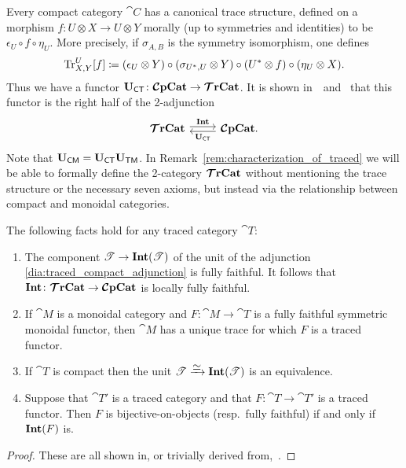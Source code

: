 \documentclass[11pt,oneside,article]{memoir}
\begin{document}
Every compact category $\cat{C}$ has a canonical trace structure, defined on a morphism $f\colon
U\otimes X\to U\otimes Y$ morally (up to symmetries and identities) to be $\epsilon_U\circ f\circ
\eta_U$. More precisely, if $\sigma_{A,B}$ is the symmetry isomorphism, one defines
\begin{equation*}
   \operatorname{Tr}^U_{X,Y}[f]\coloneqq(\epsilon_U\otimes Y)\circ (\sigma_{U^*,U}\otimes Y)\circ (U^*\otimes f)\circ (\eta_U\otimes X).
\end{equation*}
Thus we have a functor $\mathbf{U}_{\mathsf{CT}}\colon\bm{\mathcal{C}}\mathbf{pCat}\to\bm{\mathcal{T}}\mathbf{rCat}$. It is shown in~\cite{JoyalStreetVerity}~and~\cite{HK} that this functor is the right half of the 2-adjunction
\begin{equation}
      \label{dia:traced_compact_adjunction}
   \begin{tikzcd}
      \TTrCat\arrow[r,shift left=.5ex, "\Int"]&\CCompCat\arrow[l,shift left=.5ex,"\UCT"].
   \end{tikzcd}
\end{equation}
Note that $\mathbf{U}_{\mathsf{CM}}=\mathbf{U}_{\mathsf{CT}}\mathbf{U}_{\mathsf{TM}}$.  In Remark~\ref{rem:characterization_of_traced} we will be able to formally define the 2-category
$\bm{\mathcal{T}}\mathbf{rCat}$ without mentioning the trace structure or the necessary seven axioms, but instead via the
relationship between compact and monoidal categories.


\begin{lemma}
      \label{lemma:fully_faithful_and_trace}
   The following facts hold for any traced category $\cat{T}$:
   \begin{enumerate}[label={\upshape\roman*}.]
      \item The component $\mathscr{T}\to\mathbf{Int}(\mathscr{T})$ of the unit of the adjunction
         \eqref{dia:traced_compact_adjunction} is fully faithful. It follows that
         $\mathbf{Int}\colon\bm{\mathcal{T}}\mathbf{rCat}\to\bm{\mathcal{C}}\mathbf{pCat}$ is locally fully faithful.
      \item If $\cat{M}$ is a monoidal category and $F\colon\cat{M}\to\cat{T}$ is a fully faithful
         symmetric monoidal functor, then $\cat{M}$ has a unique trace for which $F$ is a traced
         functor.
      \item If $\cat{T}$ is compact then the unit
         $\cat{T}\To{\raisebox{-1ex}{$\equiv$}}\Int(\cat{T})$ is an equivalence.
      \item Suppose that $\cat{T'}$ is a traced category and that $F\colon \cat{T}\to \cat{T}'$ is a
         traced functor. Then $F$ is bijective-on-objects (resp.\ fully faithful) if and only if
         $\mathbf{Int}(F)$ is.
   \end{enumerate}
\end{lemma}
\begin{proof}
   These are all shown in, or trivially derived from,~\cite{JoyalStreetVerity}.
\end{proof}
\end{document}
